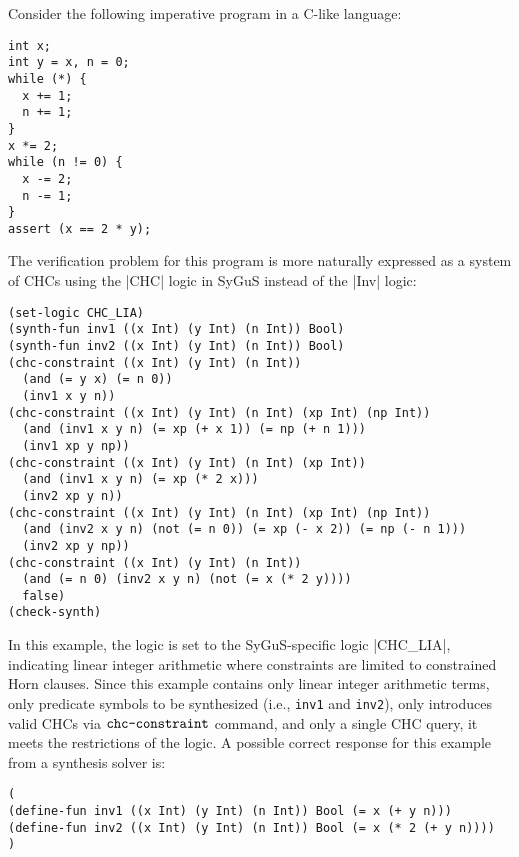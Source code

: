 \documentclass[english,a4paper,10pt]{article}
\begin{document}
\begin{example}
Consider the following imperative program in a C-like language:
\begin{lstlisting}[language=C-Like]
int x;
int y = x, n = 0;
while (*) {
  x += 1;
  n += 1;
}
x *= 2;
while (n != 0) {
  x -= 2;
  n -= 1;
}
assert (x == 2 * y);
\end{lstlisting}
The verification problem for this program is more naturally expressed as a system of CHCs
using the \code|CHC| logic in SyGuS instead of the \code|Inv| logic:
\begin{lstlisting}[language=SyGuS]
(set-logic CHC_LIA)
(synth-fun inv1 ((x Int) (y Int) (n Int)) Bool)
(synth-fun inv2 ((x Int) (y Int) (n Int)) Bool)
(chc-constraint ((x Int) (y Int) (n Int))
  (and (= y x) (= n 0))
  (inv1 x y n))
(chc-constraint ((x Int) (y Int) (n Int) (xp Int) (np Int))
  (and (inv1 x y n) (= xp (+ x 1)) (= np (+ n 1)))
  (inv1 xp y np))
(chc-constraint ((x Int) (y Int) (n Int) (xp Int))
  (and (inv1 x y n) (= xp (* 2 x)))
  (inv2 xp y n))
(chc-constraint ((x Int) (y Int) (n Int) (xp Int) (np Int))
  (and (inv2 x y n) (not (= n 0)) (= xp (- x 2)) (= np (- n 1)))
  (inv2 xp y np))
(chc-constraint ((x Int) (y Int) (n Int))
  (and (= n 0) (inv2 x y n) (not (= x (* 2 y))))
  false)
(check-synth)
\end{lstlisting}
In this example, the logic is set to the SyGuS-specific logic
\code|CHC_LIA|, indicating linear integer arithmetic
where constraints are limited to constrained Horn clauses.
Since this example contains only linear integer arithmetic terms,
only predicate symbols to be synthesized (i.e., \texttt{inv1} and \texttt{inv2}),
only introduces valid CHCs via $\texttt{chc-constraint}$ command, and
only a single CHC query,
it meets the restrictions of the logic.
A possible correct response for this example from a synthesis solver is:
\begin{lstlisting}[language=SyGuS]
(
(define-fun inv1 ((x Int) (y Int) (n Int)) Bool (= x (+ y n)))
(define-fun inv2 ((x Int) (y Int) (n Int)) Bool (= x (* 2 (+ y n))))
)
\end{lstlisting}
\end{example}



\end{document}
